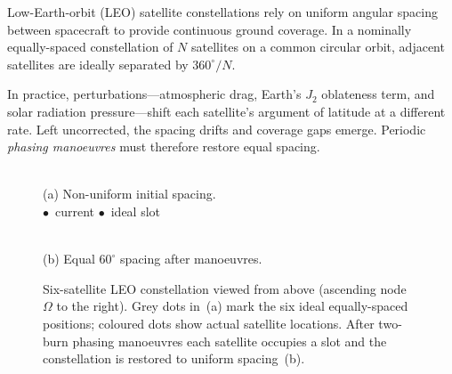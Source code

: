 Low-Earth-orbit (LEO) satellite constellations rely on uniform angular
spacing between spacecraft to provide continuous ground coverage.
In a nominally equally-spaced constellation of $N$ satellites on a
common circular orbit, adjacent satellites are ideally separated by
$360^{\circ}/N$.

In practice, perturbations---atmospheric drag, Earth's $J_2$
oblateness term, and solar radiation pressure---shift each
satellite's argument of latitude at a different rate. Left uncorrected,
the spacing drifts and coverage gaps emerge. Periodic \emph{phasing
manoeuvres} must therefore restore equal spacing.

\begin{figure}[H]
  \centering
  \begin{minipage}[t]{0.46\linewidth}
    \centering
    \\[3pt]
    {\footnotesize (a) Non-uniform initial spacing.}\\[2pt]
    {\small\textcolor{blue!60!black}{$\bullet$}~current\quad
           \textcolor{gray!60}{$\bullet$}~ideal slot}
  \end{minipage}
  \hfill
  \begin{minipage}[t]{0.46\linewidth}
    \centering
    \\[3pt]
    {\footnotesize (b) Equal $60^{\circ}$ spacing after manoeuvres.}
  \end{minipage}
  \caption{Six-satellite LEO constellation viewed from above (ascending
    node $\Omega$ to the right). Grey dots in~(a) mark the six ideal
    equally-spaced positions; coloured dots show actual satellite
    locations. After two-burn phasing manoeuvres each satellite occupies
    a slot and the constellation is restored to uniform spacing~(b).}
  \label{fig:intro:constellation}
\end{figure}

